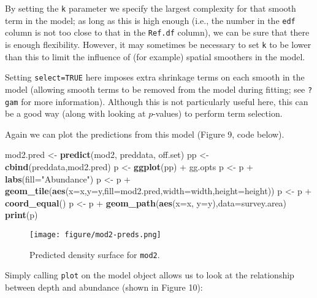 \documentclass[]{article}
\newenvironment{Shaded}{}{}
\newcommand{\KeywordTok}[1]{\textcolor[rgb]{0.00,0.44,0.13}{\textbf{{#1}}}}
\newcommand{\DataTypeTok}[1]{\textcolor[rgb]{0.56,0.13,0.00}{{#1}}}
\newcommand{\StringTok}[1]{\textcolor[rgb]{0.25,0.44,0.63}{{#1}}}
\newcommand{\NormalTok}[1]{{#1}}
\begin{document}
By setting the \texttt{k} parameter we specify the largest complexity
for that smooth term in the model; as long as this is high enough (i.e.,
the number in the \texttt{edf} column is not too close to that in the
\texttt{Ref.df} column), we can be sure that there is enough
flexibility. However, it may sometimes be necessary to set \texttt{k} to
be lower than this to limit the influence of (for example) spatial
smoothers in the model.

Setting \texttt{select=TRUE} here imposes extra shrinkage terms on each
smooth in the model (allowing smooth terms to be removed from the model
during fitting; see \texttt{?gam} for more information). Although this
is not particularly useful here, this can be a good way (along with
looking at \(p\)-values) to perform term selection.

Again we can plot the predictions from this model (Figure 9, code
below).

\begin{Shaded}
\begin{Highlighting}[]
\NormalTok{mod2.pred <-}\StringTok{ }\KeywordTok{predict}\NormalTok{(mod2, preddata, off.set)}
\NormalTok{pp <-}\StringTok{ }\KeywordTok{cbind}\NormalTok{(preddata,mod2.pred)}
\NormalTok{p <-}\StringTok{ }\KeywordTok{ggplot}\NormalTok{(pp) +}\StringTok{ }\NormalTok{gg.opts}
\NormalTok{p <-}\StringTok{ }\NormalTok{p +}\StringTok{ }\KeywordTok{labs}\NormalTok{(}\DataTypeTok{fill=}\StringTok{"Abundance"}\NormalTok{)}
\NormalTok{p <-}\StringTok{ }\NormalTok{p +}\StringTok{ }\KeywordTok{geom_tile}\NormalTok{(}\KeywordTok{aes}\NormalTok{(}\DataTypeTok{x=}\NormalTok{x,}\DataTypeTok{y=}\NormalTok{y,}\DataTypeTok{fill=}\NormalTok{mod2.pred,}\DataTypeTok{width=}\NormalTok{width,}\DataTypeTok{height=}\NormalTok{height))}
\NormalTok{p <-}\StringTok{ }\NormalTok{p +}\StringTok{ }\KeywordTok{coord_equal}\NormalTok{()}
\NormalTok{p <-}\StringTok{ }\NormalTok{p +}\StringTok{ }\KeywordTok{geom_path}\NormalTok{(}\KeywordTok{aes}\NormalTok{(}\DataTypeTok{x=}\NormalTok{x, }\DataTypeTok{y=}\NormalTok{y),}\DataTypeTok{data=}\NormalTok{survey.area)}
\KeywordTok{print}\NormalTok{(p)}
\end{Highlighting}
\end{Shaded}

\begin{figure}[htbp]
\centering
\texttt{[image: figure/mod2-preds.png]}
\caption{Predicted density surface for \texttt{mod2}.}
\end{figure}

Simply calling \texttt{plot} on the model object allows us to look at
the relationship between depth and abundance (shown in Figure 10):
\end{document}
